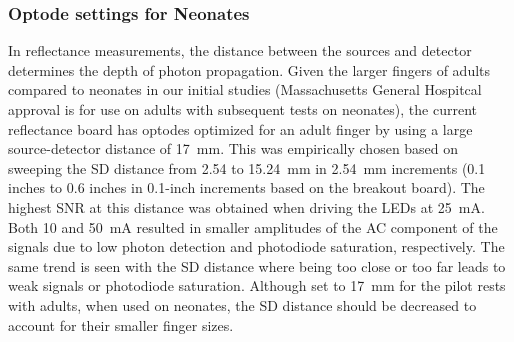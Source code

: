 \subsubsection{Optode settings for Neonates}
In reflectance measurements, the distance between the sources and detector determines the depth of photon propagation. Given the larger fingers of adults compared to neonates in our initial studies (Massachusetts General Hospitcal approval is for use on adults with subsequent tests on neonates), the current reflectance board has optodes optimized for an adult finger by using a large source-detector distance of 17~mm. This was empirically chosen based on sweeping the \ac{SD} distance from 2.54 to 15.24~mm in 2.54~mm increments (0.1 inches to 0.6 inches in 0.1-inch increments based on the breakout board). The highest \ac{SNR} at this distance was obtained when driving the \ac{LED}s at 25~mA. Both 10 and 50~mA resulted in smaller amplitudes of the \ac{AC} component of the signals due to low photon detection and photodiode saturation, respectively. The same trend is seen with the \ac{SD} distance where being too close or too far leads to weak signals or photodiode saturation. Although set to 17~mm for the pilot rests with adults, when used on neonates, the \ac{SD} distance should be decreased to account for their smaller finger sizes. 

